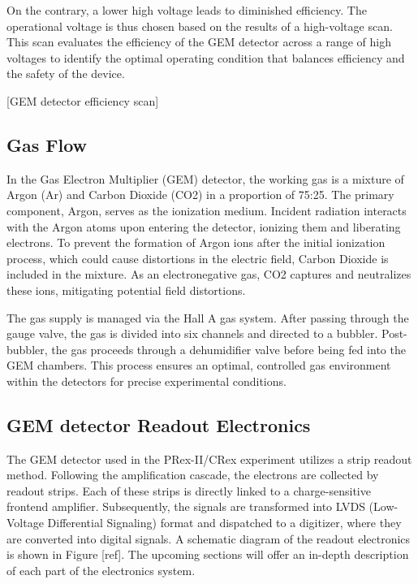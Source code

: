 On the contrary, a lower high voltage leads to diminished efficiency. The operational voltage is thus chosen based on the results of a high-voltage scan. This scan evaluates the efficiency of the GEM detector across a range of high voltages to identify the optimal operating condition that balances efficiency and the safety of the device.

[GEM detector efficiency scan]

\subsection{Gas Flow}

In the Gas Electron Multiplier (GEM) detector, the working gas is a mixture of Argon (Ar) and Carbon Dioxide (CO2) in a proportion of 75:25. The primary component, Argon, serves as the ionization medium. Incident radiation interacts with the Argon atoms upon entering the detector, ionizing them and liberating electrons. To prevent the formation of Argon ions after the initial ionization process, which could cause distortions in the electric field, Carbon Dioxide is included in the mixture. As an electronegative gas, CO2 captures and neutralizes these ions, mitigating potential field distortions.

The gas supply is managed via the Hall A gas system. After passing through the gauge valve, the gas is divided into six channels and directed to a bubbler. Post-bubbler, the gas proceeds through a dehumidifier valve before being fed into the GEM chambers. This process ensures an optimal, controlled gas environment within the detectors for precise experimental conditions.

\subsection{GEM detector Readout Electronics}

The GEM detector used in the PRex-II/CRex experiment utilizes a strip readout method. Following the amplification cascade, the electrons are collected by readout strips. Each of these strips is directly linked to a charge-sensitive frontend amplifier. Subsequently, the signals are transformed into LVDS (Low-Voltage Differential Signaling) format and dispatched to a digitizer, where they are converted into digital signals. A schematic diagram of the readout electronics is shown in Figure [ref]. The upcoming sections will offer an in-depth description of each part of the electronics system.

